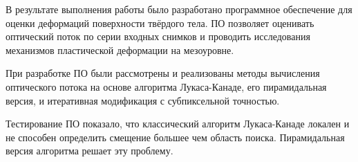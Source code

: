 \setcounter{figure}{0}

В результате выполнения работы было разработано программное обеспечение для оценки деформаций поверхности твёрдого тела.  ПО позволяет оценивать оптический поток по серии входных снимков и проводить исследования механизмов пластической деформации на мезоуровне. %

При разработке ПО были рассмотрены и реализованы методы вычисления оптического потока на основе алгоритма Лукаса-Канаде, его пирамидальная версия, и итеративная модификация с субпиксельной точностью.

Тестирование ПО показало, что классический алгоритм Лукаса-Канаде локален и не способен определить смещение большее чем область поиска. Пирамидальная версия алгоритма решает эту проблему. %
